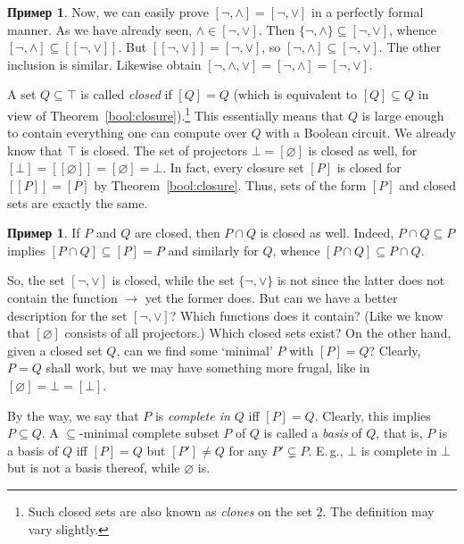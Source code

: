 \documentclass[12pt,notitlepage]{article}
\theoremstyle{plain}
\theoremstyle{definition}
\newtheorem{exm}[thm]{Пример}
\theoremstyle{plain}
\newcommand{\sbs}{\subseteq}
\newcommand{\void}{\varnothing}
\newcommand{\ul}[1]{\underline{#1}}
\newcommand{\1}{\mathbf{1}}
\newcommand{\0}{\mathbf{0}}
\begin{document}
\begin{exm}
	Now, we can easily prove $[{\neg}, {\wedge}] = [{\neg}, {\vee}]$ in a perfectly formal manner. As we have already seen, $\wedge \in [{\neg}, {\vee}]$. Then $\{ {\neg}, {\wedge} \} \sbs [{\neg}, {\vee}]$, whence $[{\neg}, {\wedge}] \sbs [[{\neg}, {\vee}]]$. But $[[{\neg}, {\vee}]] = [{\neg}, {\vee}]$, so $[{\neg}, {\wedge}] \sbs [{\neg}, {\vee}]$. The other inclusion is similar. Likewise obtain $[{\neg}, {\wedge}, {\vee}] = [{\neg}, {\wedge}] = [{\neg}, {\vee}]$.
\end{exm}

A set $Q \sbs \top$ is called \emph{closed} if $[Q] = Q$ (which is equivalent to $[Q] \sbs Q$ in view of Theorem~\ref{bool:closure}).\footnote{Such closed sets are also known as \emph{clones} on the set $\ul{2}$. The definition may vary slightly.} This essentially means that $Q$ is large enough to contain everything one can compute over $Q$ with a Boolean circuit. We already know that $\top$ is closed. The set of projectors $\bot = [\void]$ is closed as well, for $[\bot] = [[\void]] = [\void] = \bot$. In fact, every closure set $[P]$ is closed for $[[P]] = [P]$ by Theorem~\ref{bool:closure}. Thus, sets of the form $[P]$ and closed sets are exactly the same.

\begin{exm}\label{bool:clone_cap}
	If $P$ and $Q$ are closed, then $P \cap Q$ is closed as well. Indeed, $P \cap Q \sbs P$ implies $[P \cap Q] \sbs [P] = P$ and similarly for $Q$, whence $[P \cap Q] \sbs P \cap Q$.
\end{exm}

So, the set $[{\neg}, {\vee}]$ is closed, while the set $\{ {\neg}, {\vee} \}$ is not since the latter does not contain the function ${\to}$ yet the former does. But can we have a better description for the set $[{\neg}, {\vee}]$? Which functions does it contain? (Like we know that $[\void]$ consists of all projectors.) Which closed sets exist? On the other hand, given a closed set $Q$, can we find some `minimal' $P$ with $[P] = Q$? Clearly, $P = Q$ shall work, but we may have something more frugal, like in $[\void] = \bot = [\bot]$.

By the way, we say that $P$ is \emph{complete in $Q$} iff $[P] = Q$. Clearly, this implies $P \sbs Q$. A $\sbs$-minimal complete subset $P$ of $Q$ is called a \emph{basis} of $Q$, that is, $P$ is a basis of $Q$ iff $[P] = Q$ but $[P'] \neq Q$ for any $P' \subsetneq P$. E.\,g., $\bot$ is complete in $\bot$ but is not a basis thereof, while $\void$ is.
\end{document}
